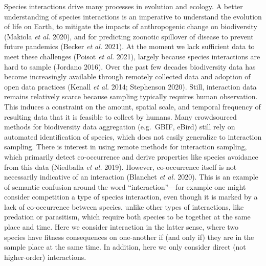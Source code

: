 \documentclass[11pt]{article}
\begin{document}
Species interactions drive many processes in evolution and ecology. A
better understanding of species interactions is an imperative to
understand the evolution of life on Earth, to mitigate the impacts of
anthropogenic change on biodiversity (Makiola \emph{et al.} 2020), and
for predicting zoonotic spillover of disease to prevent future pandemics
(Becker \emph{et al.} 2021). At the moment we lack sufficient data to
meet these challenges (Poisot \emph{et al.} 2021), largely because
species interactions are hard to sample (Jordano 2016). Over the past
few decades biodiversity data has become increasingly available through
remotely collected data and adoption of open data practices (Kenall
\emph{et al.} 2014; Stephenson 2020). Still, interaction data remains
relatively scarce because sampling typically requires human observation.
This induces a constraint on the amount, spatial scale, and temporal
frequency of resulting data that it is feasible to collect by humans.
Many crowdsourced methods for biodiversity data aggregation (e.g.~GBIF,
eBird) still rely on automated identification of species, which does not
easily generalize to interaction sampling. There is interest in using
remote methods for interaction sampling, which primarily detect
co-occurrence and derive properties like species avoidance from this
data (Niedballa \emph{et al.} 2019). However, co-occurrence itself is
not necessarily indicative of an interaction (Blanchet \emph{et al.}
2020). This is an example of semantic confusion around the word
``interaction''---for example one might consider competition a type of
species interaction, even though it is marked by a lack of co-occurrence
between species, unlike other types of interactions, like predation or
parasitism, which require both species to be together at the same place
and time. Here we consider interaction in the latter sense, where two
species have fitness consequences on one-another if (and only if) they
are in the sample place at the same time. In addition, here we only
consider direct (not higher-order) interactions.
\end{document}
